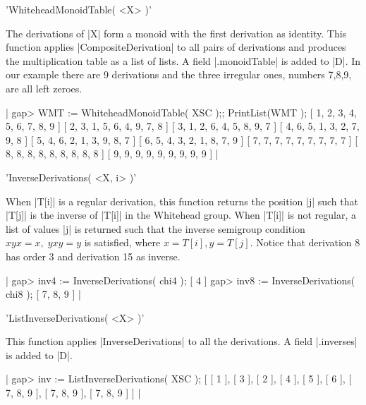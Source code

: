 %

'WhiteheadMonoidTable( <X> )'

The derivations of   |X| form a monoid  with  the first  derivation as
identity.  This function applies |CompositeDerivation| to all pairs of
derivations and produces the multiplication  table as a list of lists.
A field  |.monoidTable| is added  to |D|.  In  our example there are 9
derivations and the three irregular ones,  numbers 7,8,9, are all left
zeroes.

|    gap> WMT := WhiteheadMonoidTable( XSC );; PrintList(WMT );
    [ 1, 2, 3, 4, 5, 6, 7, 8, 9 ]
    [ 2, 3, 1, 5, 6, 4, 9, 7, 8 ]
    [ 3, 1, 2, 6, 4, 5, 8, 9, 7 ]
    [ 4, 6, 5, 1, 3, 2, 7, 9, 8 ]
    [ 5, 4, 6, 2, 1, 3, 9, 8, 7 ]
    [ 6, 5, 4, 3, 2, 1, 8, 7, 9 ]
    [ 7, 7, 7, 7, 7, 7, 7, 7, 7 ]
    [ 8, 8, 8, 8, 8, 8, 8, 8, 8 ]
    [ 9, 9, 9, 9, 9, 9, 9, 9, 9 ]  |

%

'InverseDerivations( <X, i> )'

When  |T[i]| is  a  regular  derivation,   this  function returns  the
position |j|   such  that |T[j]|  is the   inverse of |T[i]|   in  the
Whitehead group.  When |T[i]| is not regular,  a list of values |j| is
returned such that the inverse semigroup condition $xyx =  x, \; yxy =
y$ is satisfied, where $x = T[i], y = T[j]$.  Notice that derivation 8
has order 3 and derivation 15 as inverse.

|    gap> inv4 := InverseDerivations( chi4 );
    [ 4 ]
    gap> inv8 := InverseDerivations( chi8 );
    [ 7, 8, 9 ]   |

%

'ListInverseDerivations( <X> )'

This function applies |InverseDerivations| to all  the derivations.  A
field |.inverses| is added to |D|.

|    gap> inv := ListInverseDerivations( XSC );
    [ [ 1 ], [ 3 ], [ 2 ], [ 4 ], [ 5 ], [ 6 ],
      [ 7, 8, 9 ], [ 7, 8, 9 ], [ 7, 8, 9 ] ]    |

%

